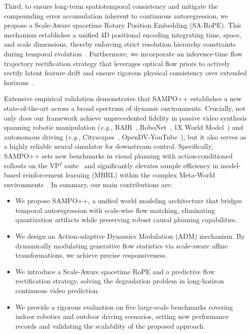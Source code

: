 Third, to ensure long-term spatiotemporal consistency and mitigate the compounding error accumulation inherent to continuous autoregression, we propose a Scale-Aware spacetime Rotary Position Embedding (SA-RoPE). This mechanism establishes a unified 4D positional encoding integrating time, space, and scale dimensions, thereby enforcing strict resolution hierarchy constraints during temporal evolution~\cite{su2024roformer,tian2025pdfactor,yesiltepe2025infinity}. Furthermore, we incorporate an inference-time flow trajectory rectification strategy that leverages optical flow priors to actively rectify latent feature drift and ensure rigorous physical consistency over extended horizons~\cite{teed2020raft, ji2026videoar}.

Extensive empirical validation demonstrates that SAMPO++ establishes a new state-of-the-art across a broad spectrum of dynamic environments. Crucially, not only does our framework achieve unprecedented fidelity in passive video synthesis spanning robotic manipulation (\textit{e.g.}, BAIR~\cite{ebert2017selfBAIR}, RoboNet~\cite{dasari2019robonet}, 1X World Model~\cite{1X_Technologies_1X_World_Model_2024}) and autonomous driving (\textit{e.g.}, Cityscapes~\cite{Cityscapes}, OpenDV-YouTube~\cite{yang2024genad}), but it also serves as a highly reliable neural simulator for downstream control. Specifically, SAMPO++ sets new benchmarks in visual planning with action-conditioned rollouts on the VP$^2$ suite~\cite{tian2023control} and significantly elevates sample efficiency in model-based reinforcement learning (MBRL) within the complex Meta-World environments~\cite{yu2020meta}.
In summary, our main contributions are:
\begin{itemize}
    \item We propose SAMPO++, a unified world modeling architecture that bridges temporal autoregression with scale-wise flow matching, eliminating quantization artifacts while preserving robust causal planning capabilities.
    
    \item We design an Action-adaptive Dynamics Modulation (ADM) mechanism. By dynamically modulating generative flow statistics via scale-aware affine transformations, we achieve precise responsiveness.
        
    \item We introduce a Scale-Aware spacetime RoPE and a predictive flow rectification strategy, solving the degradation problem in long-horizon continuous video prediction.
    
    \item We provide a rigorous evaluation on five large-scale benchmarks covering indoor robotics and outdoor driving scenarios, setting new performance records and validating the scalability of the proposed approach.
\end{itemize}

